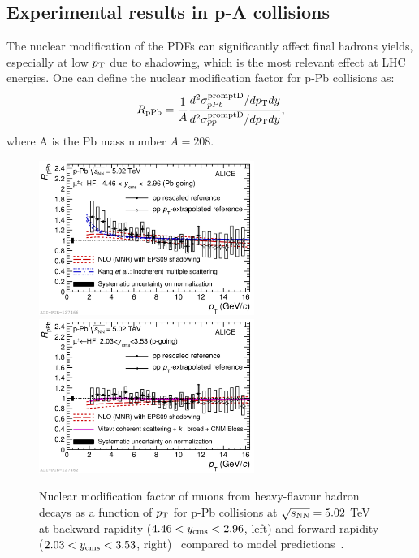\subsection{Experimental results in p-A collisions}
\label{sec:HFresultspA}
The nuclear modification of the PDFs can significantly affect final hadrons yields,
especially at low $p_{\rm T}$ due to shadowing, which is the most relevant effect at LHC energies.
One can define the nuclear modification factor for p-Pb collisions as:
\begin{equation}
R_{\rm pPb} = \frac{1}{A}\frac{d^2\sigma_{pPb}^{\rm prompt D}/dp_{\rm T} dy}{d^2\sigma_{pp}^{\rm prompt D}/dp_{\rm T} dy},
\end{equation}
where A is the Pb mass number $A = 208$. \\
\begin{figure}[!ht]
  \centering
  \includegraphics[width=7cm]{FigCap2/2017-Feb-05-Fig2b.pdf}
  \includegraphics[width=7cm]{FigCap2/2017-Feb-05-Fig2a.pdf}
  \caption{Nuclear modification factor of muons from heavy-flavour hadron decays as a function of $p_{\rm T}$ for p-Pb collisions at $\sqrt{s_{\rm NN}} = 5.02$ TeV at backward rapidity ($4.46 < y_{\rm cms} < 2.96$, left) and forward rapidity ($2.03 < y_{\rm cms} < 3.53$, right)~\cite{Acharya:2017hdv} compared to model predictions~\cite{Kang:2014hha,Mangano:1991jk}. }
  \label{fig:muons}
\end{figure}
